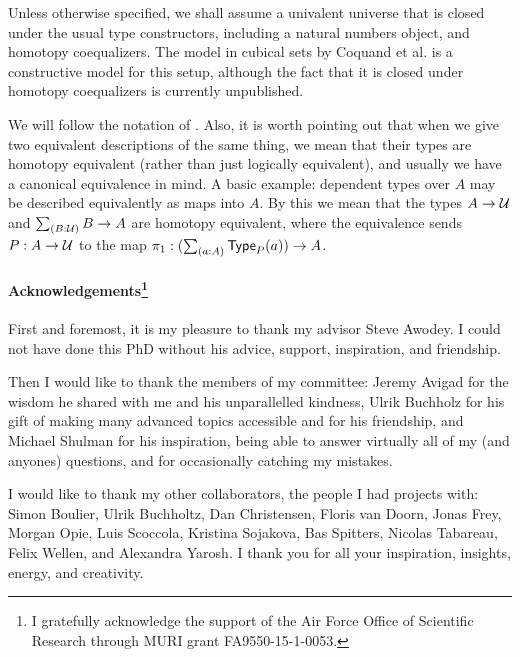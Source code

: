 Unless otherwise specified, we shall assume a univalent universe that is closed
under the usual type constructors, including a natural numbers object, and
homotopy coequalizers. The model in cubical sets by Coquand et al. \cite{BezemCoquandHuber} is a
constructive model for this setup, although the fact that it is closed under
homotopy coequalizers is currently unpublished.

We will follow the notation of \cite{hottbook}.
Also, it is worth pointing out that when we give two equivalent descriptions
of the same thing, we mean that their types are homotopy equivalent
(rather than just logically equivalent), and usually
we have a canonical equivalence in mind. A basic
example: dependent types over $A$ may be described equivalently as maps into
$A$. By this we mean that the types $A\to\mathcal{U}$ and $\sm{B:\UU}B\to A$ are 
homotopy equivalent, where the equivalence sends $P:A\to\mathcal{U}$ to the map
$\pi_1:(\sm{a:A}\P(a))\to A$.

\paragraph{Acknowledgements\footnote{I gratefully acknowledge the support of the Air Force Office of Scientific Research through MURI grant FA9550-15-1-0053.}}
First and foremost, it is my pleasure to thank my advisor Steve Awodey. I could not have done this PhD without his advice, support, inspiration, and friendship.

Then I would like to thank the members of my committee: Jeremy Avigad for the wisdom he shared with me and his unparallelled kindness, Ulrik Buchholz for his gift of making many advanced topics accessible and for his friendship, and Michael Shulman for his inspiration, being able to answer virtually all of my (and anyones) questions, and for occasionally catching my mistakes.

I would like to thank my other collaborators, the people I had projects with:
Simon Boulier, Ulrik Buchholtz, Dan Christensen, Floris van Doorn, Jonas Frey, Morgan Opie, Luis Scoccola, Kristina Sojakova, Bas Spitters, Nicolas Tabareau, Felix Wellen, and Alexandra Yarosh. I thank you for all your inspiration, insights, energy, and creativity.

